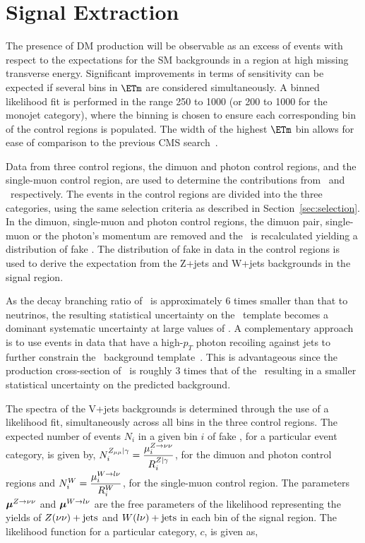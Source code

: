 \section{Signal Extraction}

The presence of DM production will be observable as an excess of events with respect to the expectations for the 
SM backgrounds in a region at high missing transverse energy. Significant improvements in terms of sensitivity can be expected if 
several bins in $\ETm$ are considered simultaneously. 
A binned likelihood fit is performed in the range 250 \gev to 1000 \gev (or 200 \gev to 1000 \gev 
for the monojet category), where the binning is chosen to ensure each corresponding bin of the control regions  
is populated. The width of the highest $\ETm$ bin allows for ease of comparison to the previous CMS search~\cite{monojet1}. 

Data from three control regions, the dimuon and photon control regions, and the single-muon control region, are used to determine the contributions from \Zvvjets~and 
\Wlvjets~respectively. The events in the control regions are divided into the three  categories, using the same selection criteria as 
described in Section~\ref{sec:selection}. In the dimuon, single-muon and photon control regions, the dimuon pair, single-muon or the photon's 
momentum are removed and the \ETm ~is recalculated yielding a distribution of fake \ETm. The distribution of fake \ETm 
in data in the control regions is used to derive the expectation from the Z+jets and W+jets backgrounds in the signal region.

As the decay branching ratio of \Zmm~is approximately 6 times smaller than that to neutrinos, the resulting statistical 
uncertainty on the \Zvvjets~template becomes a dominant systematic uncertainty at large values of \ETm.
A complementary approach is to use events in data that have a high-$p_{T}$ 
photon recoiling against jets to further constrain the \Zvvjets~background template~\cite{CMS-PAS-SUS-08-002}. This is advantageous since the production cross-section 
of \phojets~is roughly 3 times that of the \Zvvjets~resulting in a smaller statistical uncertainty on the predicted background. 
 
The \ETm spectra of the V+jets backgrounds is determined through the use of a likelihood fit, simultaneously across all bins 
in the three control regions. 
The expected number of events $N_{i}$ in a given bin $i$ of fake \ETm, for a particular event category, is given by, 
$N^{Z_{\mu\mu}|\gamma }_{i}=  \dfrac{{\mu^{Z\to\nu\nu}_{i}}}{R^{Z|\gamma}_{i}}$, 
for the dimuon and photon control regions and  $N^{W}_{i} =  \dfrac{{\mu^{W\to l\nu}_{i}}}{R^{W}_{i}}$,
for the single-muon control region. The parameters $\boldsymbol{\mu}^{Z\to\nu\nu}$ and $\boldsymbol{\mu}^{W\to l\nu}$ are the free parameters 
of the likelihood representing the yields of $Z(\nu\nu)+\textrm{jets}$ and $W(l\nu)+\textrm{jets}$ in each bin of the signal region. The likelihood function for a 
particular category, $c$, is given as,   


